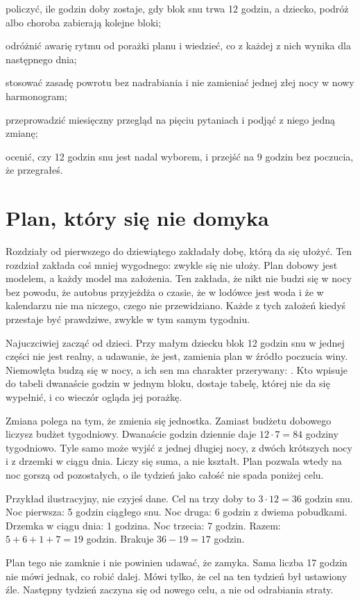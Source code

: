 
\begin{cele}
\item policzyć, ile godzin doby zostaje, gdy blok snu trwa 12 godzin, a dziecko, podróż albo choroba zabierają kolejne bloki;
\item odróżnić awarię rytmu od porażki planu i wiedzieć, co z każdej z nich wynika dla następnego dnia;
\item stosować zasadę powrotu bez nadrabiania i nie zamieniać jednej złej nocy w nowy harmonogram;
\item przeprowadzić miesięczny przegląd na pięciu pytaniach i podjąć z niego jedną zmianę;
\item ocenić, czy 12 godzin snu jest nadal wyborem, i przejść na 9 godzin bez poczucia, że przegrałeś.
\end{cele}

\section{Plan, który się nie domyka}

Rozdziały od pierwszego do dziewiątego zakładały dobę, którą da się ułożyć. Ten rozdział zakłada coś mniej wygodnego: zwykle się nie ułoży. Plan dobowy jest modelem, a każdy model ma założenia. Ten zakłada, że nikt nie budzi się w nocy bez powodu, że autobus przyjeżdża o czasie, że w lodówce jest woda i że w kalendarzu nie ma niczego, czego nie przewidziano. Każde z tych założeń kiedyś przestaje być prawdziwe, zwykle w tym samym tygodniu.

Najuczciwiej zacząć od dzieci. Przy małym dziecku blok 12 godzin snu w jednej części nie jest realny, a udawanie, że jest, zamienia plan w źródło poczucia winy. Niemowlęta budzą się w nocy, a ich sen ma charakter przerywany: . Kto wpisuje do tabeli dwanaście godzin w jednym bloku, dostaje tabelę, której nie da się wypełnić, i co wieczór ogląda jej porażkę.

Zmiana polega na tym, że zmienia się jednostka. Zamiast budżetu dobowego liczysz budżet tygodniowy. Dwanaście godzin dziennie daje $12 \cdot 7 = 84$ godziny tygodniowo. Tyle samo może wyjść z jednej długiej nocy, z dwóch krótszych nocy i z drzemki w ciągu dnia. Liczy się suma, a nie kształt. Plan pozwala wtedy na noc gorszą od pozostałych, o ile tydzień jako całość nie spada poniżej celu.

\begin{przyklad}
Przykład ilustracyjny, nie czyjeś dane. Cel na trzy doby to $3 \cdot 12 = 36$ godzin snu. Noc pierwsza: 5 godzin ciągłego snu. Noc druga: 6 godzin z dwiema pobudkami. Drzemka w ciągu dnia: 1 godzina. Noc trzecia: 7 godzin. Razem: $5 + 6 + 1 + 7 = 19$ godzin. Brakuje $36 - 19 = 17$ godzin.

Plan tego nie zamknie i nie powinien udawać, że zamyka. Sama liczba 17 godzin nie mówi jednak, co robić dalej. Mówi tylko, że cel na ten tydzień był ustawiony źle. Następny tydzień zaczyna się od nowego celu, a nie od odrabiania straty.
\end{przyklad}

